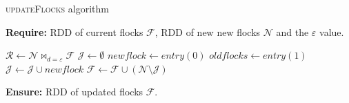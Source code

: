 \documentclass{article}
\begin{document}
    \begin{algorithm} \caption{\textsc{updateFlocks} algorithm}
        \textbf{Require:} RDD of current flocks $\mathcal F$, RDD of new new flocks $\mathcal N$ and the $\varepsilon$ value.
        \begin{algorithmic}[1]
            \State $\mathcal R \gets \mathcal N \Join_{d=\varepsilon} \mathcal F$ 
            \State $\mathcal J \gets \emptyset$ 
                \State $newflock \gets entry(0)$ 
                \State $oldflocks \gets entry(1)$ 
                        \State $\mathcal J \gets \mathcal J \cup newflock$
                    \EndIf
                \EndFor
            \EndFor
            \State $\mathcal F \gets \mathcal F \cup (\mathcal N \setminus \mathcal J)$ 
        \end{algorithmic}
        \textbf{Ensure:} RDD of updated flocks $\mathcal F$.
    \end{algorithm}
\end{document}
